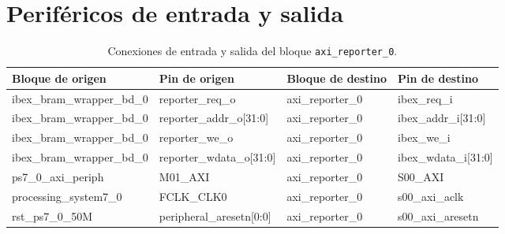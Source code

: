 \section{Periféricos de entrada y salida}
\begin{table}[!ht]
    \centering
    \caption{Conexiones de entrada y salida del bloque \texttt{axi\_reporter\_0}.}
    \label{tab:gpios_io}
    \begin{tabular}{|l|l|l|l|}
    \hline
        Bloque de origen            & Pin de origen             & Bloque de destino & Pin de destino        \\ \hline
        ibex\_bram\_wrapper\_bd\_0  & reporter\_req\_o          & axi\_reporter\_0  & ibex\_req\_i          \\ \hline
        ibex\_bram\_wrapper\_bd\_0  & reporter\_addr\_o[31:0]   & axi\_reporter\_0  & ibex\_addr\_i[31:0]   \\ \hline
        ibex\_bram\_wrapper\_bd\_0  & reporter\_we\_o           & axi\_reporter\_0  & ibex\_we\_i           \\ \hline
        ibex\_bram\_wrapper\_bd\_0  & reporter\_wdata\_o[31:0]  & axi\_reporter\_0  & ibex\_wdata\_i[31:0]  \\ \hline
        ps7\_0\_axi\_periph         & M01\_AXI                  & axi\_reporter\_0  & S00\_AXI              \\ \hline
        processing\_system7\_0      & FCLK\_CLK0                & axi\_reporter\_0  & s00\_axi\_aclk        \\ \hline
        rst\_ps7\_0\_50M            & peripheral\_aresetn[0:0]  & axi\_reporter\_0  & s00\_axi\_aresetn     \\ \hline
    \end{tabular}
\end{table}
